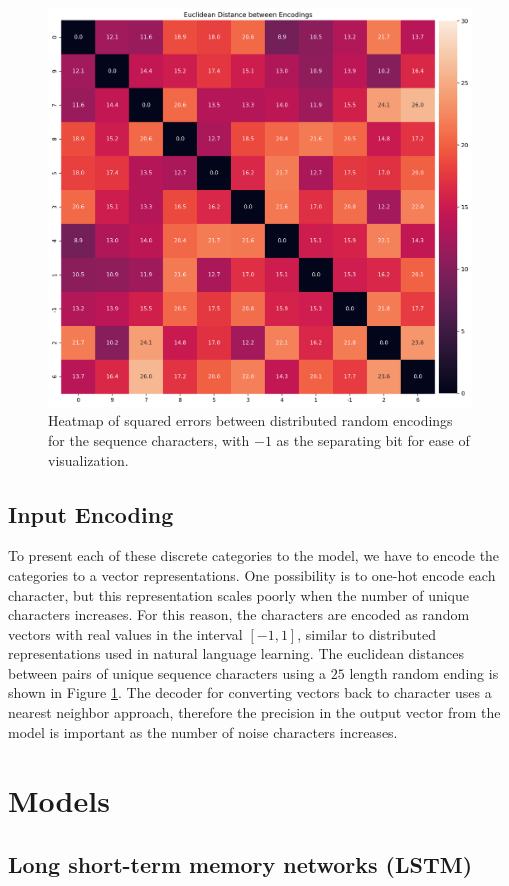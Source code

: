 \documentclass{article}
\begin{document}
\begin{figure}[!h]
    \centering
    \includegraphics[width=0.7\linewidth]{../notebooks/matrix-distances.png}
    \caption{Heatmap of squared errors between distributed random encodings for the sequence characters, with $-1$ as the separating bit for ease of visualization.}
    \label{fig:encoding-distance}
\end{figure}

\subsection*{Input Encoding}

To present each of these discrete categories to the model, we have to encode the categories to a vector representations. One possibility is to one-hot encode each character, but this representation scales poorly when the number of unique characters increases. For this reason, the characters are encoded as random vectors with real values in the interval $\left[-1, 1\right]$, similar to distributed representations used in natural language learning. \cite{mikolov2013distributed} The euclidean distances between pairs of unique sequence characters using a $25$ length random ending is shown in Figure \ref{fig:encoding-distance}. The decoder for converting vectors back to character uses a nearest neighbor approach, therefore the precision in the output vector from the model is important as the number of noise characters increases. 

\section*{Models}

\subsection*{Long short-term memory networks (LSTM)}
\end{document}
